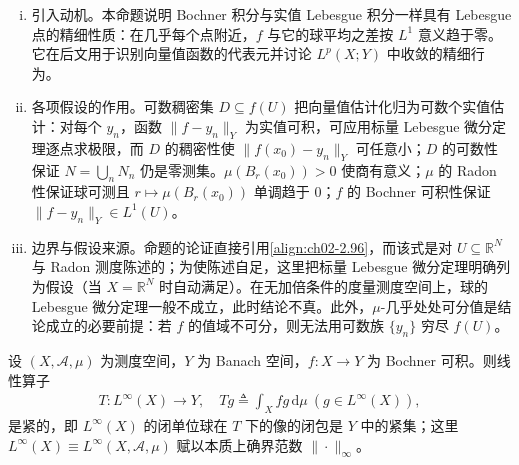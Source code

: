 \documentclass[../../main.tex]{subfiles}%
\begin{document}
\begin{remark}\label{remark:ch04-Lebesgue点动机}
\begin{enumerate}[(i)]
\item 引入动机。本命题说明 Bochner 积分与实值 Lebesgue 积分一样具有 Lebesgue 点的精细性质：在几乎每个点附近，$f$ 与它的球平均之差按 $L^1$ 意义趋于零。它在后文用于识别向量值函数的代表元并讨论 $L^p(X;Y)$ 中收敛的精细行为。

\item 各项假设的作用。可数稠密集 $D\subseteq f(U)$ 把向量值估计化归为可数个实值估计：对每个 $y_n$，函数 $\|f-y_n\|_Y$ 为实值可积，可应用标量 Lebesgue 微分定理逐点求极限，而 $D$ 的稠密性使 $\|f(x_0)-y_n\|_Y$ 可任意小；$D$ 的可数性保证 $N=\bigcup_nN_n$ 仍是零测集。$\mu(B_r(x_0))>0$ 使商有意义；$\mu$ 的 Radon 性保证球可测且 $r\mapsto\mu(B_r(x_0))$ 单调趋于 $0$；$f$ 的 Bochner 可积性保证 $\|f-y_n\|_Y\in L^1(U)$。

\item 边界与假设来源。命题的论证直接引用\eqref{align:ch02-2.96}，而该式是对 $U\subseteq\mathbb{R}^N$ 与 Radon 测度陈述的；为使陈述自足，这里把标量 Lebesgue 微分定理明确列为假设（当 $X=\mathbb{R}^N$ 时自动满足）。在无加倍条件的度量测度空间上，球的 Lebesgue 微分定理一般不成立，此时结论不真。此外，$\mu$-几乎处处可分值是结论成立的必要前提：若 $f$ 的值域不可分，则无法用可数族 $\{y_n\}$ 穷尽 $f(U)$。
\end{enumerate}
\end{remark}

\begin{proposition}\label{proposition:ch04-紧算子}
设 $(X,\mathcal{A},\mu)$ 为测度空间，$Y$ 为 Banach 空间，$f:X\to Y$ 为 Bochner 可积。则线性算子
\begin{align*}
T:L^\infty(X)\to Y,\quad Tg\triangleq \int_X fg\,\mathrm{d}\mu\ (g\in L^\infty(X)),
\end{align*}
是紧的，即 $L^\infty(X)$ 的闭单位球在 $T$ 下的像的闭包是 $Y$ 中的紧集；这里 $L^\infty(X)\equiv L^\infty(X,\mathcal{A},\mu)$ 赋以本质上确界范数 $\|\cdot\|_\infty$。
\end{proposition}
\end{document}
